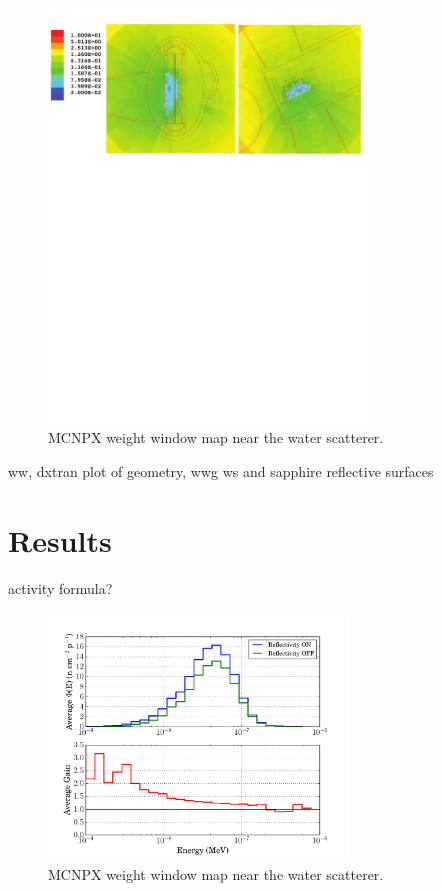 \documentclass[a4paper,
              ]{jacow}
\begin{document}
\begin{figure}[!htb]
   \centering
   \includegraphics*[trim = 0mm 170mm 0mm 0mm, width=85mm]{graphics/ws.pdf}
   \caption{MCNPX weight window map near the water scatterer.}
   \label{wsmap}
\end{figure}

ww, dxtran
plot of geometry, wwg
ws and sapphire
reflective surfaces


\section{Results}

activity formula?

\begin{figure}[!htb]
   \centering
   \includegraphics*[trim = 10mm 0mm 15mm 0mm, width=80mm]{graphics/gain.pdf}
   \caption{MCNPX weight window map near the water scatterer.}
   \label{gain}
\end{figure}
\end{document}
